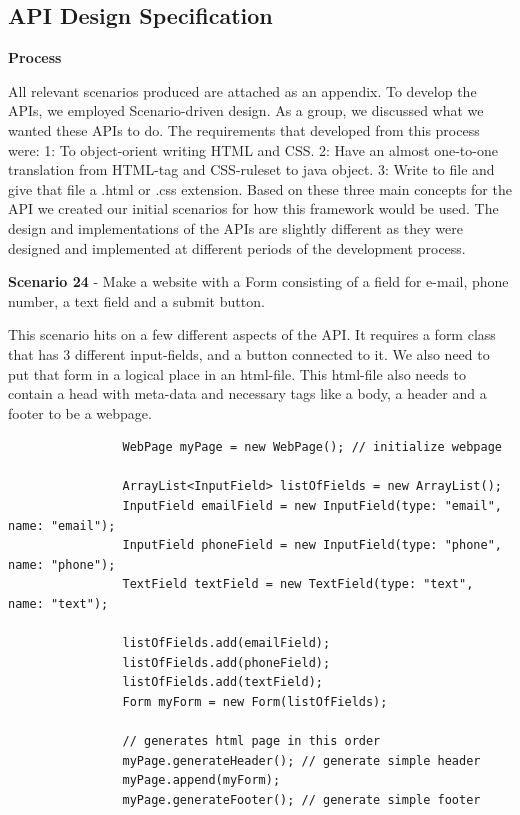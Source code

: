 \documentclass[12pt]{article}
\begin{document}
    \subsection{API Design Specification}


        \textbf{Process}

        All relevant scenarios produced are attached as an appendix.
To develop the APIs, we employed Scenario-driven design. As a group, we discussed what we wanted these APIs to do. The requirements that developed from this process were:
 1: To object-orient writing HTML and CSS.
2: Have an almost one-to-one translation from HTML-tag and CSS-ruleset to java object.
3: Write to file and give that file a .html or .css extension. Based on these three main concepts for the API we created our initial scenarios for how this framework would be used. 
The design and implementations of the APIs are slightly different as they were designed and implemented at different periods of the development process.

\textbf{Scenario 24} - Make a website with a Form consisting of a field for e-mail, phone number, a text field and a submit button.

This scenario hits on a few different aspects of the API. It requires a form class that has 3 different input-fields, and a button connected to it. We also need to put that form in a logical place in an html-file. This html-file also needs to contain a head with meta-data and necessary tags like a body, a header and a footer to be a webpage.


        \begin{shaded}
            \begin{lstlisting}
                WebPage myPage = new WebPage(); // initialize webpage

                ArrayList<InputField> listOfFields = new ArrayList();
                InputField emailField = new InputField(type: "email", name: "email");
                InputField phoneField = new InputField(type: "phone", name: "phone");
                TextField textField = new TextField(type: "text", name: "text");

                listOfFields.add(emailField);
                listOfFields.add(phoneField);
                listOfFields.add(textField);
                Form myForm = new Form(listOfFields);

                // generates html page in this order
                myPage.generateHeader(); // generate simple header
                myPage.append(myForm);
                myPage.generateFooter(); // generate simple footer
            \end{lstlisting}
        \end{shaded}
\end{document}

